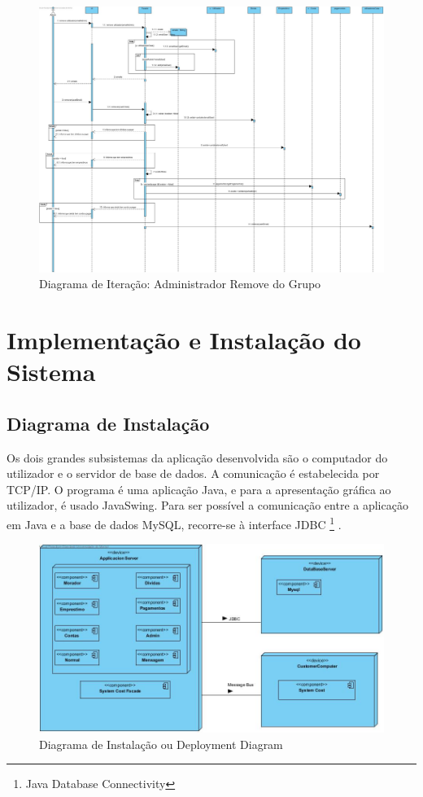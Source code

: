 \begin{figure}[htb!]
	\centering
	\includegraphics[scale=0.27]{imagens/DiagramaIt/AdminRemoveDoGrupo}  
	\caption{Diagrama de Iteração: Administrador Remove do Grupo}  
\end{figure}


\chapter{Implementação e Instalação do Sistema}

\section{Diagrama de Instalação}

Os dois grandes subsistemas da aplicação desenvolvida são o computador do utilizador e o servidor de base de dados. A comunicação é estabelecida por TCP/IP. O programa é uma aplicação Java, e para a apresentação gráfica ao utilizador, é usado JavaSwing. Para ser possível a comunicação entre a aplicação em Java e a base de dados MySQL, recorre-se à interface JDBC \footnote{Java Database Connectivity} . 

\begin{figure}[htb!]
	\centering
	\includegraphics[scale=0.4]{imagens/DiagramInstalacao/DeploymentDiagram}  
	\caption{Diagrama de Instalação ou Deployment Diagram}  
\end{figure}


